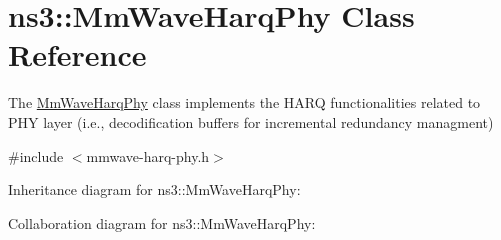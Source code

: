 \hypertarget{classns3_1_1MmWaveHarqPhy}{}\section{ns3\+:\+:Mm\+Wave\+Harq\+Phy Class Reference}
\label{classns3_1_1MmWaveHarqPhy}


The \hyperlink{classns3_1_1MmWaveHarqPhy}{Mm\+Wave\+Harq\+Phy} class implements the H\+A\+RQ functionalities related to P\+HY layer (i.\+e., decodification buffers for incremental redundancy managment)  




{\ttfamily \#include $<$mmwave-\/harq-\/phy.\+h$>$}



Inheritance diagram for ns3\+:\+:Mm\+Wave\+Harq\+Phy\+:


Collaboration diagram for ns3\+:\+:Mm\+Wave\+Harq\+Phy\+:
